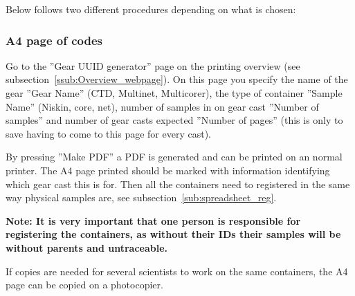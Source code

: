 \documentclass[a4paper,english, 11pt]{article}
\begin{document}
Below follows two different procedures depending on what is chosen:

\subsubsection{A4 page of codes} %
\label{ssub:A4_page}

Go to the ''Gear UUID generator'' page on the printing overview (see subsection~\ref{ssub:Overview_webpage}). 
On this page you specify the name of the gear ''Gear Name'' (CTD, Multinet, Multicorer), the type of container ''Sample Name'' (Niskin, core, net), number of samples in on gear cast ''Number of samples'' and number of gear casts expected ''Number of pages'' (this is only to save having to come to this page for every cast). 

By pressing ''Make PDF'' a PDF is generated and can be printed on an normal printer. The A4 page printed should be marked with information identifying which gear cast this is for. Then all the containers need to registered in the same way physical samples are, see subsection~\ref{sub:spreadsheet_reg}.

\textbf{Note: It is very important that one person is responsible for registering the containers, as without their IDs their samples will be without parents and untraceable.}

If copies are needed for several scientists to work on the same containers, the A4 page can be copied on a photocopier. 
\end{document}
